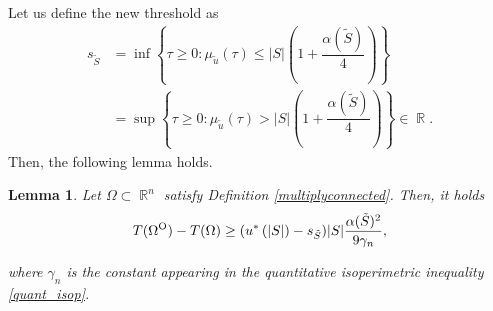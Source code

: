\documentclass[oneside,a4paper,11pt,notitlepage]{article}
\newcommand{\abs}[1]{{\left|#1\right|}}
\theoremstyle{definition}
\theoremstyle{plain}
\newtheorem{lemma}[theorem]{Lemma}
\theoremstyle{definition}
\DeclareMathOperator{\R}{\mathbb{R}}
\newcommand{\OO}{\text{\normalfont  O}}
\begin{document}
Let us define the new threshold as
\begin{equation}\label{thresholdAs}
\begin{aligned}
        s_{\tilde{ S}}&=\inf\left\{ \tau\geq 0: \mu_{\tilde u}(\tau)\leq \abs{ S }\left(1+\dfrac{\alpha(\tilde S )}{4}\right)\right\}\\
    &=\sup\left\{ \tau \geq 0 : \mu_{\tilde u}(\tau)> \abs{ S }\left(1+\dfrac{\alpha(\tilde S )}{4}\right)\right\} \in \R.
    \end{aligned}
\end{equation}
Then, the following lemma holds.
\begin{lemma}
Let $\Omega\subset\R^n$ satisfy Definition \ref{multiplyconnected}. Then, it holds
    \begin{equation}
        \label{essastorsion}
         T(\Omega^\OO)- T(\Omega)\geq  (u^\ast\left(\abs{S}\right) -s_{\tilde{S}})\abs{S}\frac{\alpha(\tilde{ S})^2}{9\gamma_n},
    \end{equation}

    where $\gamma_n$ is the constant appearing in the quantitative isoperimetric inequality \eqref{quant_isop}.
\end{lemma}
\end{document}
